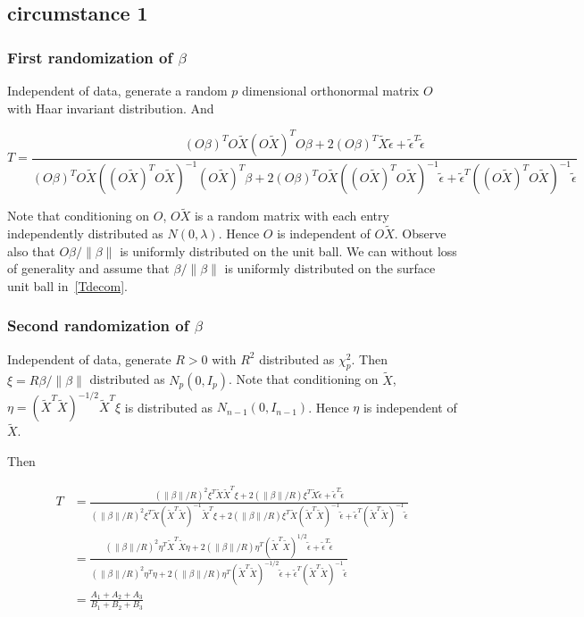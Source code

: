 \documentclass[review]{elsarticle}
\theoremstyle{plain}
\theoremstyle{definition}
\theoremstyle{remark}
\begin{document}
\subsection{circumstance 1}
\subsubsection{First randomization of $\beta$}
Independent of data, generate a random $p$ dimensional orthonormal matrix $O$ with Haar invariant distribution. And 

\begin{equation}
    T=\frac{{(O\beta)}^T O\tilde{X}{(O\tilde{X})}^T O\beta+
        2{(O\beta)}^T \tilde{X}\tilde{\epsilon}+
        \tilde{\epsilon}^T\tilde{\epsilon}
    }{{(O\beta)}^T O\tilde{X}{({(O\tilde{X})}^T O\tilde{X})}^{-1}{(O\tilde{X})}^T \beta+
        2{(O\beta)}^T O\tilde{X}{({(O\tilde{X})}^T O\tilde{X})}^{-1}\tilde{\epsilon}+
        \tilde{\epsilon}^T{({(O\tilde{X})}^T O\tilde{X})}^{-1}\tilde{\epsilon}
    }
\end{equation}

Note that conditioning on $O$, $O\tilde{X}$ is a random matrix with each entry independently distributed as $N(0,\lambda)$. Hence $O$ is independent of $O\tilde{X}$. Observe also that $O\beta/\|\beta\|$ is uniformly distributed on the unit ball.  We can without loss of generality and assume that $\beta/\|\beta\|$ is uniformly distributed on the surface unit ball in~\eqref{Tdecom}.

\subsubsection{Second randomization of $\beta$}
Independent of data, generate $R>0$ with $R^2$ distributed as $\chi^2_{p}$. Then $\xi=R\beta/\|\beta\|$ distributed as $N_p(0,I_p)$.
Note that conditioning on $\tilde{X}$, $\eta={(\tilde{X}^T\tilde{X})}^{-1/2}\tilde{X}^T \xi$ is distributed as $N_{n-1}(0,I_{n-1})$. Hence $\eta$ is independent of $\tilde{X}$.

Then

\begin{equation}
    \begin{aligned}
        T&=\frac{{(\|\beta\|/R)}^2\xi^T \tilde{X}\tilde{X}^T \xi+
        2(\|\beta\|/R)\xi^T \tilde{X}\tilde{\epsilon}+
        \tilde{\epsilon}^T\tilde{\epsilon}
    }{{(\|\beta\|/R)}^2\xi^T \tilde{X}{(\tilde{X}^T\tilde{X})}^{-1}\tilde{X}^T \xi+
        2(\|\beta\|/R)\xi^T \tilde{X}{(\tilde{X}^T\tilde{X})}^{-1}\tilde{\epsilon}+
        \tilde{\epsilon}^T{(\tilde{X}^T\tilde{X})}^{-1}\tilde{\epsilon}
    }\\
        &=
        \frac{{(\|\beta\|/R)}^2\eta^T \tilde{X}^T\tilde{X} \eta+
        2(\|\beta\|/R)\eta^T {(\tilde{X}^T\tilde{X})}^{1/2}\tilde{\epsilon}+
        \tilde{\epsilon}^T\tilde{\epsilon}
    }{{(\|\beta\|/R)}^2\eta^T\eta+
        2(\|\beta\|/R)\eta^T{(\tilde{X}^T\tilde{X})}^{-1/2}\tilde{\epsilon}+
        \tilde{\epsilon}^T{(\tilde{X}^T\tilde{X})}^{-1}\tilde{\epsilon}
    }\\
        &=\frac{A_1+A_2+A_3}{B_1+B_2+B_3}
    \end{aligned}
\end{equation}
\end{document}
